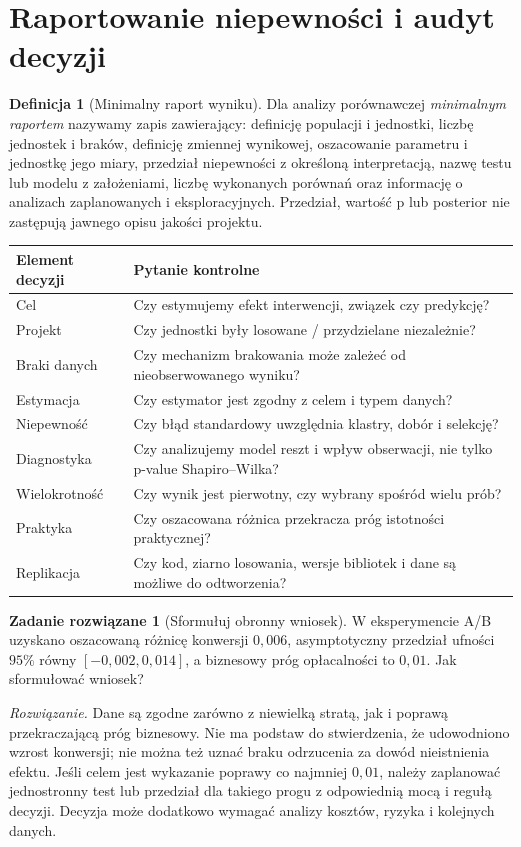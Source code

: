 \documentclass[11pt,a4paper,oneside]{report}
\numberwithin{equation}{chapter}
\theoremstyle{plain}
\theoremstyle{definition}
\newtheorem{definicja}{Definicja}[chapter]
\newtheorem{zadanie}{Zadanie rozwiązane}[chapter]
\theoremstyle{remark}
\begin{document}
\section{Raportowanie niepewności i audyt decyzji}
\begin{definicja}[Minimalny raport wyniku]
Dla analizy porównawczej \emph{minimalnym raportem} nazywamy zapis zawierający: definicję populacji i jednostki, liczbę jednostek i braków, definicję zmiennej wynikowej, oszacowanie parametru i jednostkę jego miary, przedział niepewności z określoną interpretacją, nazwę testu lub modelu z założeniami, liczbę wykonanych porównań oraz informację o analizach zaplanowanych i eksploracyjnych. Przedział, wartość p lub posterior nie zastępują jawnego opisu jakości projektu.
\end{definicja}

\begin{center}\small
\begin{tabular}{>{\raggedright\arraybackslash}p{}>{\raggedright\arraybackslash}p{}}
\toprule
\textbf{Element decyzji} & \textbf{Pytanie kontrolne}\\
\midrule
Cel & Czy estymujemy efekt interwencji, związek czy predykcję?\\
Projekt & Czy jednostki były losowane / przydzielane niezależnie?\\
Braki danych & Czy mechanizm brakowania może zależeć od nieobserwowanego wyniku?\\
Estymacja & Czy estymator jest zgodny z celem i typem danych?\\
Niepewność & Czy błąd standardowy uwzględnia klastry, dobór i selekcję?\\
Diagnostyka & Czy analizujemy model reszt i wpływ obserwacji, nie tylko p-value Shapiro--Wilka?\\
Wielokrotność & Czy wynik jest pierwotny, czy wybrany spośród wielu prób?\\
Praktyka & Czy oszacowana różnica przekracza próg istotności praktycznej?\\
Replikacja & Czy kod, ziarno losowania, wersje bibliotek i dane są możliwe do odtworzenia?\\
\bottomrule
\end{tabular}
\end{center}

\begin{zadanie}[Sformułuj obronny wniosek]
W eksperymencie A/B uzyskano oszacowaną różnicę konwersji $0{,}006$, asymptotyczny przedział ufności $95\%$ równy $[-0{,}002,0{,}014]$, a biznesowy próg opłacalności to $0{,}01$. Jak sformułować wniosek?\par
\emph{Rozwiązanie.} Dane są zgodne zarówno z niewielką stratą, jak i poprawą przekraczającą próg biznesowy. Nie ma podstaw do stwierdzenia, że udowodniono wzrost konwersji; nie można też uznać braku odrzucenia za dowód nieistnienia efektu. Jeśli celem jest wykazanie poprawy co najmniej $0{,}01$, należy zaplanować jednostronny test lub przedział dla takiego progu z odpowiednią mocą i regułą decyzji. Decyzja może dodatkowo wymagać analizy kosztów, ryzyka i kolejnych danych.
\end{zadanie}
\end{document}
